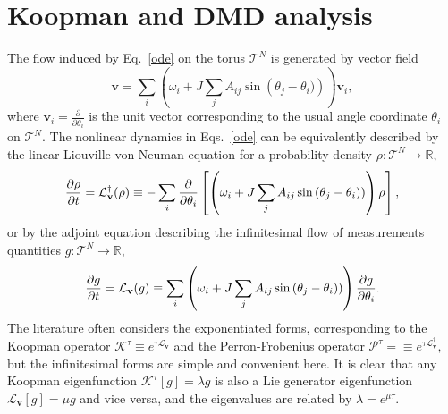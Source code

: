 \documentclass[aps,pre,amsmath,amssymb,floatfix,onecolumn,notitlepage,10pt]{revtex4-1}
\begin{document}
\section{Koopman and DMD analysis}
The flow induced by Eq.~\eqref{ode} on the torus ${\mathcal{T}}^N$ is generated by vector field 
\begin{equation}
\mathbf{v}=\sum_i \left(\omega_i + J\sum_j A_{ij} \sin\left(\theta_j-\theta_i)\right)\right)\mathbf{v}_i,
\end{equation}
where $\mathbf{v}_i=\frac{\partial}{\partial \theta_i}$ is the unit vector corresponding to the usual angle coordinate $\theta_i$ on ${\mathcal{T}}^N$.  The nonlinear dynamics in Eqs.~\eqref{ode} can be equivalently described by the linear Liouville-von Neuman equation for a probability density $\rho : \mathcal{T}^N \to \mathbb{R}$,
\begin{equation}
\frac{\partial \rho}{\partial t} = {\cal L}^\dag_{\mathbf{v}}(\rho) \equiv -\sum_i \frac{\partial}{\partial \theta_i}\left[ \left(\omega_i + J\sum_j A_{ij} \sin\left(\theta_j-\theta_i)\right)\right)\rho\right],
\end{equation}
or by the adjoint equation describing the infinitesimal flow of measurements quantities $g : \mathcal{T}^N \to \mathbb{R}$,
\begin{equation}
\frac{\partial g}{\partial t} = {\cal L}_{\mathbf{v}}(g) \equiv \sum_i \left(\omega_i + J\sum_j A_{ij} \sin\left(\theta_j-\theta_i)\right)\right)\frac{\partial g}{\partial \theta_i}.
\end{equation}
The literature often considers the exponentiated forms, corresponding to the Koopman operator ${\mathcal{K}}^\tau \equiv e^{\tau \mathcal{L}_{\mathbf{v}}}$ and the Perron-Frobenius operator $\mathcal{P}^\tau=\equiv e^{\tau \mathcal{L}^{\dag}_{\mathbf{v}}},$ but the infinitesimal forms are simple and convenient here.  It is clear that any Koopman eigenfunction $\mathcal{K}^\tau[g]=\lambda g$ is also a Lie generator eigenfunction $\mathcal{L}_\mathbf{v}[g]=\mu g$ and vice versa, and the eigenvalues  are related by $\lambda = e^{\mu \tau}$. 
\end{document}
